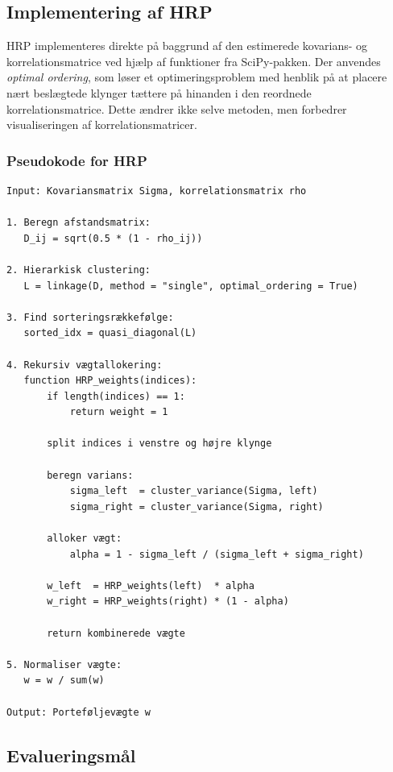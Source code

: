 \documentclass[../main.tex]{subfiles}
\begin{document}
\subsection{Implementering af HRP}


HRP implementeres direkte på baggrund af den estimerede kovarians- og korrelationsmatrice ved hjælp af funktioner fra SciPy-pakken. Der anvendes \textit{optimal ordering}\cite{noauthor_optimal_leaf_ordering_nodate}, som løser et optimeringsproblem med henblik på at placere nært beslægtede klynger tættere på hinanden i den reordnede korrelationsmatrice. Dette ændrer ikke selve metoden, men forbedrer visualiseringen af korrelationsmatricer.

\subsubsection*{Pseudokode for HRP}

\begin{verbatim}
Input: Kovariansmatrix Sigma, korrelationsmatrix rho

1. Beregn afstandsmatrix:
   D_ij = sqrt(0.5 * (1 - rho_ij))

2. Hierarkisk clustering:
   L = linkage(D, method = "single", optimal_ordering = True)

3. Find sorteringsrækkefølge:
   sorted_idx = quasi_diagonal(L)

4. Rekursiv vægtallokering:
   function HRP_weights(indices):
       if length(indices) == 1:
           return weight = 1

       split indices i venstre og højre klynge

       beregn varians:
           sigma_left  = cluster_variance(Sigma, left)
           sigma_right = cluster_variance(Sigma, right)

       alloker vægt:
           alpha = 1 - sigma_left / (sigma_left + sigma_right)

       w_left  = HRP_weights(left)  * alpha
       w_right = HRP_weights(right) * (1 - alpha)

       return kombinerede vægte

5. Normaliser vægte:
   w = w / sum(w)

Output: Porteføljevægte w
\end{verbatim}




\subsection{Evalueringsmål}
\end{document}
